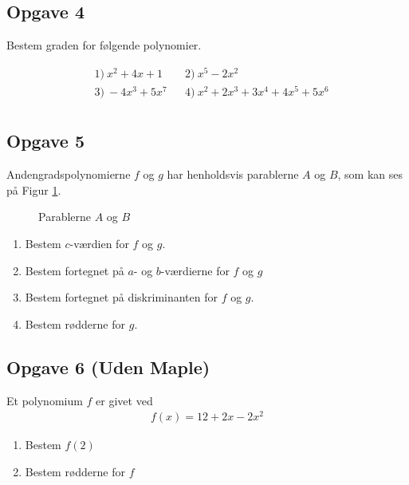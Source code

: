 \subsection*{Opgave 4}

Bestem graden for følgende polynomier.

\begin{align*}
	&1) \ x^2+4x+1   &&2) \ x^5-2x^2    \\
	&3) \ -4x^3+5x^7   &&4) \  x^2+2x^3+3x^4+4x^5+5x^6    \\
\end{align*}

\subsection*{Opgave 5}

Andengradspolynomierne $f$ og $g$ har henholdsvis parablerne $A$ og $B$, som kan ses på Figur \ref{fig:parabler}.
\begin{figure}[H]
	\centering
	\caption{Parablerne $A$ og $B$}
	\label{fig:parabler}
\end{figure}

\begin{enumerate}[label=\roman*)]
	\item Bestem $c$-værdien for $f$ og $g$.
	\item Bestem fortegnet på $a$- og $b$-værdierne for $f$ og $g$
	\item Bestem fortegnet på diskriminanten for $f$ og $g$.
	\item Bestem rødderne for $g$.
\end{enumerate}

\subsection*{Opgave 6 (Uden Maple)}
Et polynomium $f$ er givet ved
\begin{align*}
	f(x) = 12 + 2 x - 2 x^2
\end{align*}
\begin{enumerate}[label=\roman*)]
	\item Bestem $f(2)$
	\item Bestem rødderne for $f$
\end{enumerate}


